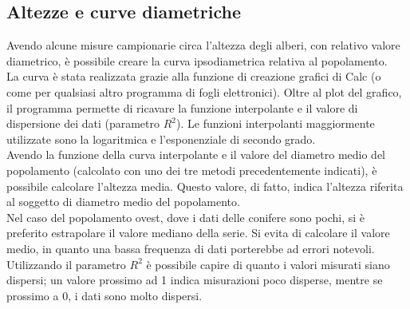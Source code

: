 \subsection{Altezze e curve diametriche}
Avendo alcune misure campionarie circa l'altezza degli alberi, con relativo valore diametrico, è possibile creare la curva ipsodiametrica relativa al popolamento.\\
La curva è stata realizzata grazie alla funzione di creazione grafici di Calc (o come per qualsiasi altro programma di fogli elettronici). Oltre al plot del grafico, il programma permette di ricavare la funzione interpolante e il valore di dispersione dei dati (parametro $R^2$). Le funzioni interpolanti maggiormente utilizzate sono la logaritmica e l'esponenziale di secondo grado.\\
Avendo la funzione della curva interpolante e il valore del diametro medio del popolamento (calcolato con uno dei tre metodi precedentemente indicati), è possibile calcolare l'altezza media. Questo valore, di fatto, indica l'altezza riferita al soggetto di diametro medio del popolamento.\\
Nel caso del popolamento ovest, dove i dati delle conifere sono pochi, si è preferito estrapolare il valore mediano della serie. Si evita di calcolare il valore medio, in quanto una bassa frequenza di dati porterebbe ad errori notevoli.\\
Utilizzando il parametro $R^2$ è possibile capire di quanto i valori misurati siano dispersi; un valore prossimo ad 1 indica misurazioni poco disperse, mentre se prossimo a 0, i dati sono molto dispersi.
